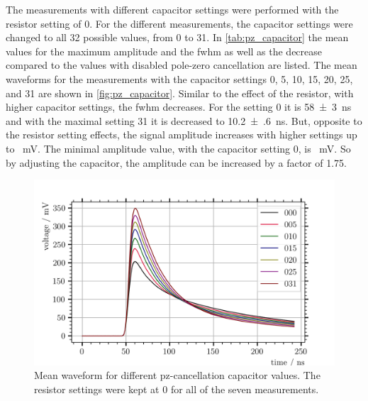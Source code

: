 The measurements with different capacitor settings were performed with the resistor setting of 0.
For the different measurements, the capacitor settings were changed to all 32 possible values, from 0 to 31.
In \autoref{tab:pz_capacitor} the mean values for the maximum amplitude and the \ac{fwhm} as well as the decrease compared to the values with disabled pole-zero cancellation are listed.
The mean waveforms for the measurements with the capacitor settings 0, 5, 10, 15, 20, 25, and 31 are shown in \autoref{fig:pz_capacitor}.
Similar to the effect of the resistor, with higher capacitor settings, the \ac{fwhm} decreases.
For the setting 0 it is \SI{58(3)}{\nano\second} and with the maximal setting 31 it is decreased to \SI{10.2(6)}{\nano\second}.
But, opposite to the resistor setting effects, the signal amplitude increases with higher settings up to \SI{}{\milli\volt}.
The minimal amplitude value, with the capacitor setting 0, is \SI{}{\milli\volt}.
So by adjusting the capacitor, the amplitude can be increased by a factor of \num{1.75}.
\begin{figure}
	\centering
	\includegraphics[width=1.\textwidth]{pictures/pz_capacitor}
	\caption[Mean waveform for different pz-cancellation capacitor values.]{Mean waveform for different pz-cancellation capacitor values. The resistor settings were kept at 0 for all of the seven measurements.}
	\label{fig:pz_capacitor}
\end{figure}

